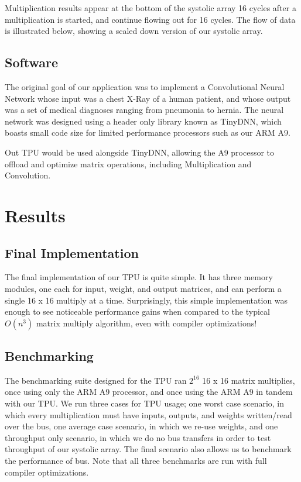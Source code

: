 \documentclass[11pt, conference, onecolumn]{IEEEtran}
\begin{document}
        Multiplication results appear at the bottom of the systolic array 16 cycles after
        a multiplication is started, and continue flowing out for 16 cycles. The flow of
        data is illustrated below, showing a scaled down version of our systolic array.

    \subsection{Software}
        The original goal of our application was to implement a Convolutional Neural
        Network whose input was a chest X-Ray of a human patient, and whose output was a
        set of medical diagnoses ranging from pneumonia to hernia. The neural network
        was designed using a header only library known as TinyDNN, which boasts small
        code size for limited performance processors such as our ARM A9.


        Out TPU would be used alongside TinyDNN, allowing the A9 processor to offload and
        optimize matrix operations, including Multiplication and Convolution.
\section{Results}
    \subsection{Final Implementation}
        The final implementation of our TPU is quite simple. It has three memory modules,
        one each for input, weight, and output matrices, and can perform a single 16 x 16
        multiply at a time. Surprisingly, this simple implementation was enough to
        see noticeable performance gains when compared to the typical $O(n^3)$ matrix
        multiply algorithm, even with compiler optimizations!

    \subsection{Benchmarking}
        The benchmarking suite designed for the TPU ran $2^{16}$ 16 x 16 matrix multiplies,
        once using only the ARM A9 processor, and once using the ARM A9 in tandem with
        our TPU. We run three cases for TPU usage; one worst case scenario, in which every
        multiplication must have inputs, outputs, and weights written/read over the bus,
        one average case scenario, in which we re-use weights, and one throughput only
        scenario, in which we do no bus transfers in order to test throughput of our
        systolic array. The final scenario also allows us to benchmark the performance of
        bus. Note that all three benchmarks are run with full compiler optimizations.
\end{document}
